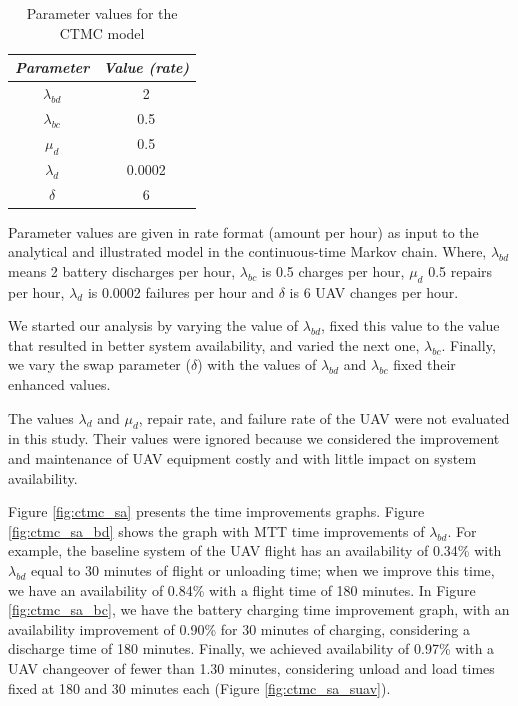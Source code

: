 \documentclass[conference]{IEEEtran}
\begin{document}
\begin{table}[htbp]
\caption{Parameter values for the CTMC model}
\begin{center}
\begin{tabular}{c|c}
\hline
\textbf{\textit{Parameter}} & \textbf{\textit{Value (rate)}} \\
\hline
\hline
  $\lambda_{bd}$  & 2 \\
  $\lambda_{bc}$   & 0.5 \\
  $\mu_{d}$   & 0.5  \\
  $\lambda_{d}$ & 0.0002 \\
  $\delta$  & 6 \\
\hline
\end{tabular}
\label{tab:ctmc_parameter_values}
\end{center}
\end{table}


Parameter values are given in rate format (amount per hour) as input to the analytical and illustrated model in the continuous-time Markov chain. Where, $\lambda_{bd}$ means 2 battery discharges per hour, $\lambda_{bc}$ is 0.5 charges per hour, $\mu_{d}$ 0.5 repairs per hour, $\lambda_{d}$ is 0.0002 failures per hour and $\delta$ is 6 UAV changes per hour.

We started our analysis by varying the value of $\lambda_{bd}$, fixed this value to the value that resulted in better system availability, and varied the next one, $\lambda_{bc}$. Finally, we vary the swap parameter ($\delta$) with the values of $\lambda_{bd}$ and $\lambda_{bc}$ fixed their enhanced values.

The values $\lambda_{d}$ and $\mu_{d}$, repair rate, and failure rate of the UAV were not evaluated in this study. Their values were ignored because we considered the improvement and maintenance of UAV equipment costly and with little impact on system availability.

Figure \ref{fig:ctmc_sa} presents the time improvements graphs. Figure \ref{fig:ctmc_sa_bd} shows the graph with MTT time improvements of $\lambda_{bd}$. For example, the baseline system of the UAV flight has an availability of 0.34\% with $\lambda_{bd}$ equal to 30 minutes of flight or unloading time; when we improve this time, we have an availability of 0.84\% with a flight time of 180 minutes. In Figure \ref{fig:ctmc_sa_bc}, we have the battery charging time improvement graph, with an availability improvement of 0.90\% for 30 minutes of charging, considering a discharge time of 180 minutes. Finally, we achieved availability of 0.97\% with a UAV changeover of fewer than 1.30 minutes, considering unload and load times fixed at 180 and 30 minutes each (Figure \ref{fig:ctmc_sa_suav}).
\end{document}
